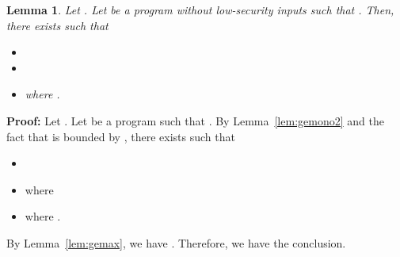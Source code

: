 \documentclass{llncs}
\newtheorem{lemma}[theorem]{Lemma}
\newenvironment{proof}{\noindent\rm{\bf Proof:}}{\hbox{}\vspace*{0.2\baselineskip}}
\begin{document}
\begin{lemma}
  Let .  Let  be a program without low-security
  inputs such that .  Then, there exists  such
  that
\begin{itemize}
\item 
\item 
\item  where .
\end{itemize}
\label{lem:gemax3}
\end{lemma}
\begin{proof}
  Let .  Let  be a program such that .  By Lemma~\ref{lem:gemono2} and the fact that  is bounded by , there exists
   such that
\begin{itemize}
\item 
\item  where 
\item  where
  .
\end{itemize}
By Lemma~\ref{lem:gemax}, we have .  Therefore, we
have the conclusion.
\end{proof}
\end{document}
